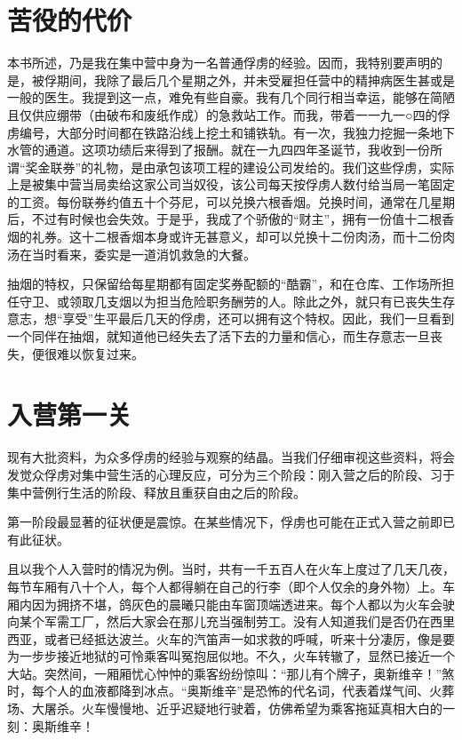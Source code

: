 \documentclass[11pt,oneside]{book}
\begin{document}
\begin{common-format}
\section{苦役的代价}
本书所述，乃是我在集中营中身为一名普通俘虏的经验。因而，我特别要声明的是，被俘期间，我除了最后几个星期之外，并未受雇担任营中的精抻病医生甚或是一般的医生。我提到这一点，难免有些自豪。我有几个同行相当幸运，能够在简陋且仅供应绷带（由破布和废纸作成）的急救站工作。而我，带着一一九一○四的俘虏编号，大部分时间都在铁路沿线上挖土和铺铁轨。有一次，我独力挖掘一条地下水管的通道。这项功绩后来得到了报酬。就在一九四四年圣诞节，我收到一份所谓“奖金联券”的礼物，是由承包该项工程的建设公司发给的。我们这些俘虏，实际上是被集中营当局卖给这家公司当奴役，该公司每天按俘虏人数付给当局一笔固定的工资。每份联券约值五十个芬尼，可以兑换六根香烟。兑换时间，通常在几星期后，不过有时候也会失效。于是乎，我成了个骄傲的“财主”，拥有一份值十二根香烟的礼券。这十二根香烟本身或许无甚意义，却可以兑换十二份肉汤，而十二份肉汤在当时看来，委实是一道消饥救急的大餐。

抽烟的特权，只保留给每星期都有固定奖券配额的“酷霸”，和在仓库、工作场所担任守卫、或领取几支烟以为担当危险职务酬劳的人。除此之外，就只有已丧失生存意志，想“享受”生平最后几天的俘虏，还可以拥有这个特权。因此，我们一旦看到一个同伴在抽烟，就知道他已经失去了活下去的力量和信心，而生存意志一旦丧失，便很难以恢复过来。

\section{入营第一关}
现有大批资料，为众多俘虏的经验与观察的结晶。当我们仔细审视这些资料，将会发觉众俘虏对集中营生活的心理反应，可分为三个阶段：刚入营之后的阶段、习于集中营例行生活的阶段、释放且重获自由之后的阶段。

第一阶段最显著的征状便是震惊。在某些情况下，俘虏也可能在正式入营之前即已有此征状。

且以我个人入营时的情况为例。当时，共有一千五百人在火车上度过了几天几夜，每节车厢有八十个人，每个人都得躺在自己的行李（即个人仅余的身外物）上。车厢内因为拥挤不堪，鸽灰色的晨曦只能由车窗顶端透进来。每个人都以为火车会驶向某个军需工厂，然后大家会在那儿充当强制劳工。没有人知道我们是否仍在西里西亚，或者已经抵达波兰。火车的汽笛声一如求救的呼喊，听来十分凄厉，像是要为一步步接近地狱的可怜乘客叫冤抱屈似地。不久，火车转辙了，显然已接近一个大站。突然间，一厢厢忧心忡忡的乘客纷纷惊叫：“那儿有个牌子，奥新维辛！”煞时，每个人的血液都降到冰点。“奥斯维辛”是恐怖的代名词，代表着煤气间、火葬场、大屠杀。火车慢慢地、近乎迟疑地行驶着，仿佛希望为乘客拖延真相大白的一刻：奥斯维辛！


\end{common-format}
\end{document}

